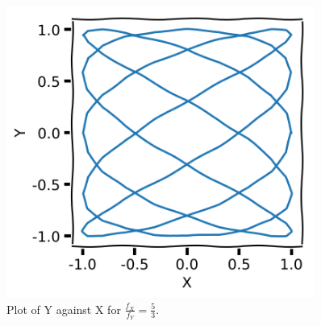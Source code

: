 \documentclass[11pt]{article}
\begin{document}
\begin{figure}[htp]
\begin{minipage}{0.45\textwidth}
	\includegraphics[width=0.9\textwidth]{lissajous_5_3_1_1_0_0.01_100.png}
	\caption{Plot of Y against X for $\frac{f_X}{f_Y}=\frac{5}{3}$.}
	\label{ratio53}
	\end{minipage}
\end{figure}
\newpage
\end{document}
